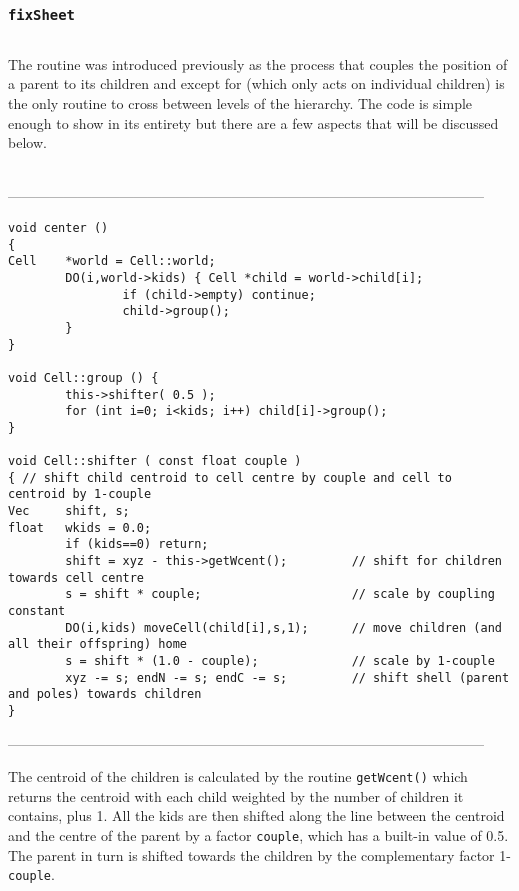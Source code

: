 \subsubsection{{\tt fixSheet}}


\subsection{}

The  routine was introduced previously as the process that couples
the position of a parent to its children and except for  (which only
acts on individual children) is the only routine to cross between levels of the 
hierarchy.  The code is simple enough to show in its entirety but there are a
few aspects that will be discussed below.
\begin{singlespace}
\ \\
------------------------------------------------------------------------------------------------------
\begin{tiny}
\begin{verbatim}
void center ()
{
Cell    *world = Cell::world;
        DO(i,world->kids) { Cell *child = world->child[i];
                if (child->empty) continue;
                child->group();
        }
}

void Cell::group () {
        this->shifter( 0.5 );
        for (int i=0; i<kids; i++) child[i]->group();
}

void Cell::shifter ( const float couple )
{ // shift child centroid to cell centre by couple and cell to centroid by 1-couple
Vec     shift, s;
float   wkids = 0.0;
        if (kids==0) return;
        shift = xyz - this->getWcent();         // shift for children towards cell centre
        s = shift * couple;                     // scale by coupling constant
        DO(i,kids) moveCell(child[i],s,1);      // move children (and all their offspring) home
        s = shift * (1.0 - couple);             // scale by 1-couple
        xyz -= s; endN -= s; endC -= s;         // shift shell (parent and poles) towards children
}
\end{verbatim}
\end{tiny}
------------------------------------------------------------------------------------------------------
\end{singlespace}
The centroid of the children is calculated by the routine {\tt getWcent()} which returns the
centroid with each child weighted by the number of children it contains, plus 1. All the kids
are then shifted along the line between the centroid and the centre of the parent by a factor
{\tt couple}, which has a built-in value of 0.5.   The parent in turn is shifted towards the
children by the complementary factor 1-{\tt couple}.

